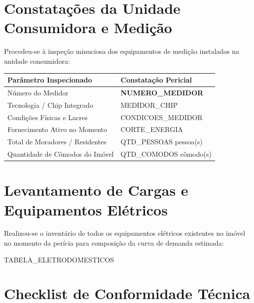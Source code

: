 \documentclass[11pt,a4paper]{article}
\begin{document}
\vspace{0.4cm}

\section{Constatações da Unidade Consumidora e Medição}

Procedeu-se à inspeção minuciosa dos equipamentos de medição instalados na unidade consumidora:

\begin{table}[H]
\centering
\begin{tabularx}{\textwidth}{@{}X X@{}}
\toprule
\textbf{Parâmetro Inspecionado} & \textbf{Constatação Pericial} \\
\midrule
Número do Medidor               & \textbf{{{NUMERO_MEDIDOR}}} \\
Tecnologia / Chip Integrado     & {{MEDIDOR_CHIP}} \\
Condições Físicas e Lacres      & {{CONDICOES_MEDIDOR}} \\
Fornecimento Ativo no Momento   & {{CORTE_ENERGIA}} \\
Total de Moradores / Residentes & {{QTD_PESSOAS}} pessoa(s) \\
Quantidade de Cômodos do Imóvel & {{QTD_COMODOS}} cômodo(s) \\
\bottomrule
\end{tabularx}
\end{table}

\vspace{0.4cm}

\section{Levantamento de Cargas e Equipamentos Elétricos}

Realizou-se o inventário de todos os equipamentos elétricos existentes no imóvel no momento da perícia para composição da curva de demanda estimada:

{{TABELA_ELETRODOMESTICOS}}

\vspace{0.4cm}

\section{Checklist de Conformidade Técnica}
\end{document}
